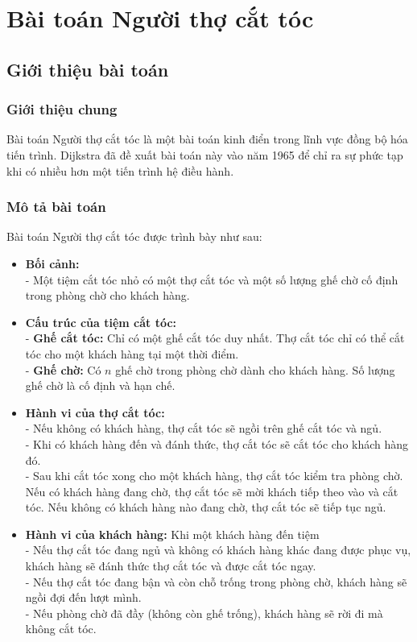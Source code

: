 \chapter{Bài toán Người thợ cắt tóc}
\label{Chapter2}

\section{Giới thiệu bài toán}
\subsection{Giới thiệu chung}
Bài toán Người thợ cắt tóc là một bài toán kinh điển trong lĩnh vực đồng bộ hóa tiến trình. Dijkstra đã đề xuất bài toán này vào năm 1965 để chỉ ra sự phức tạp khi có nhiều hơn một tiến trình hệ điều hành.

\subsection{Mô tả bài toán}
Bài toán Người thợ cắt tóc được trình bày như sau:
    \begin{itemize}
        \item \textbf{Bối cảnh:}\\
        - Một tiệm cắt tóc nhỏ có một thợ cắt tóc và một số lượng ghế chờ cố định trong phòng chờ cho khách hàng.
        
        \item \textbf{Cấu trúc của tiệm cắt tóc:}\\
        - \textbf{Ghế cắt tóc:} Chỉ có một ghế cắt tóc duy nhất. Thợ cắt tóc chỉ có thể cắt tóc cho một khách hàng tại một thời điểm.\\
        - \textbf{Ghế chờ:} Có $n$ ghế chờ trong phòng chờ dành cho khách hàng. Số lượng ghế chờ là cố định và hạn chế.
        
        \item \textbf{Hành vi của thợ cắt tóc:}\\
        - Nếu không có khách hàng, thợ cắt tóc sẽ ngồi trên ghế cắt tóc và ngủ.\\
        - Khi có khách hàng đến và đánh thức, thợ cắt tóc sẽ cắt tóc cho khách hàng đó.\\
        - Sau khi cắt tóc xong cho một khách hàng, thợ cắt tóc kiểm tra phòng chờ. Nếu có khách hàng đang chờ, thợ cắt tóc sẽ mời khách tiếp theo vào và cắt tóc. Nếu không có khách hàng nào đang chờ, thợ cắt tóc sẽ tiếp tục ngủ.
    
        \item \textbf{Hành vi của khách hàng:} Khi một khách hàng đến tiệm\\
        - Nếu thợ cắt tóc đang ngủ và không có khách hàng khác đang được phục vụ, khách hàng sẽ đánh thức thợ cắt tóc và được cắt tóc ngay.\\
        - Nếu thợ cắt tóc đang bận và còn chỗ trống trong phòng chờ, khách hàng sẽ ngồi đợi đến lượt mình.\\
        - Nếu phòng chờ đã đầy (không còn ghế trống), khách hàng sẽ rời đi mà không cắt tóc.
    \end{itemize}

